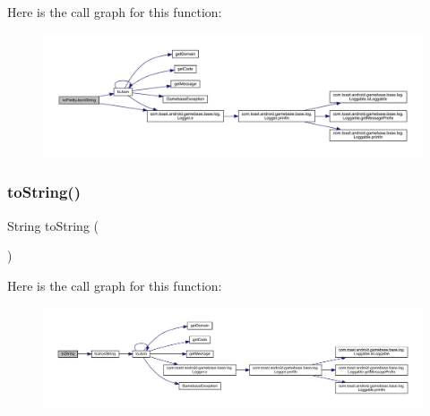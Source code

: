 Here is the call graph for this function\+:
\nopagebreak
\begin{figure}[H]
\begin{center}
\leavevmode
\includegraphics[width=350pt]{classcom_1_1toast_1_1android_1_1gamebase_1_1base_1_1_gamebase_exception_a054431f3d988a22295cfc8b784ff2637_cgraph}
\end{center}
\end{figure}
\mbox{\label{classcom_1_1toast_1_1android_1_1gamebase_1_1base_1_1_gamebase_exception_ad146fa8579a5f8a876c4688cc5a68520}} 
\subsubsection{\texorpdfstring{to\+String()}{toString()}}
{\footnotesize\ttfamily String to\+String (\begin{DoxyParamCaption}{ }\end{DoxyParamCaption})}

Here is the call graph for this function\+:
\nopagebreak
\begin{figure}[H]
\begin{center}
\leavevmode
\includegraphics[width=350pt]{classcom_1_1toast_1_1android_1_1gamebase_1_1base_1_1_gamebase_exception_ad146fa8579a5f8a876c4688cc5a68520_cgraph}
\end{center}
\end{figure}


